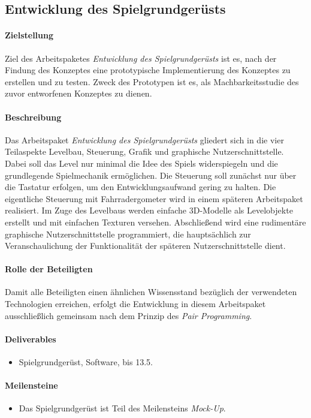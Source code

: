 \subsection{Entwicklung des Spielgrundgerüsts}

\paragraph{Zielstellung}\noindent
Ziel des Arbeitspaketes \textit{Entwicklung des Spielgrundgerüsts} ist es, nach der Findung des Konzeptes eine prototypische Implementierung des Konzeptes zu erstellen und zu testen. Zweck des Prototypen ist es, als Machbarkeitsstudie des zuvor entworfenen Konzeptes zu dienen.

\paragraph{Beschreibung}\noindent
Das Arbeitspaket \textit{Entwicklung des Spielgrundgerüsts} gliedert sich in die vier Teilaspekte Levelbau, Steuerung, Grafik und graphische Nutzerschnittstelle.\\
Dabei soll das Level nur minimal die Idee des Spiels widerspiegeln und die grundlegende Spielmechanik ermöglichen. Die Steuerung soll zunächst nur über die Tastatur erfolgen, um den Entwicklungsaufwand gering zu halten. Die eigentliche Steuerung mit Fahrradergometer wird in einem späteren Arbeitspaket realisiert. Im Zuge des Levelbaus werden einfache 3D-Modelle als Levelobjekte erstellt und mit einfachen Texturen versehen. Abschließend wird eine rudimentäre graphische Nutzerschnittstelle programmiert, die hauptsächlich zur Veranschaulichung der Funktionalität der späteren Nutzerschnittstelle dient.

\paragraph{Rolle der Beteiligten}\noindent
Damit alle Beteiligten einen ähnlichen Wissensstand bezüglich der verwendeten Technologien erreichen, erfolgt die Entwicklung in diesem Arbeitspaket ausschließlich gemeinsam nach dem Prinzip des \textit{Pair Programming}\cite[S. 42ff]{xp}.

\paragraph{Deliverables}\noindent
\begin{itemize}
\item Spielgrundgerüst, Software, bis 13.5.
\end{itemize}

\paragraph{Meilensteine}\noindent
\begin{itemize}
\item Das Spielgrundgerüst ist Teil des Meilensteins \textit{Mock-Up}.
\end{itemize}
